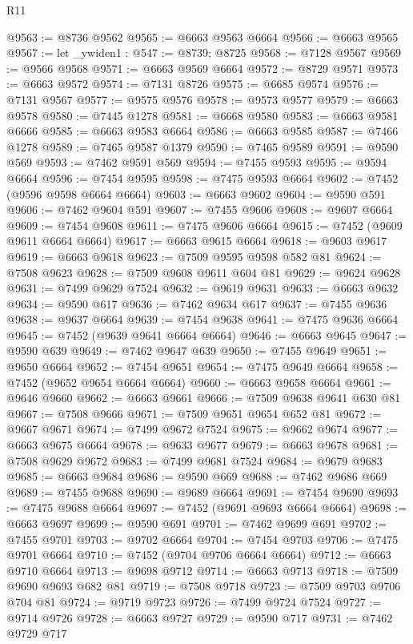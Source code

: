\begin{lexlean}{R11}
\begin{coremodule}
@9563 := @8736 @9562
@9565 := @6663 @9563 @6664
@9566 := @6663 @9565
@9567 := let _ywiden1 : @547 := @8739; @8725
@9568 := @7128 @9567
@9569 := @9566 @9568
@9571 := @6663 @9569 @6664
@9572 := @8729 @9571
@9573 := @6663 @9572
@9574 := @7131 @8726
@9575 := @6685 @9574
@9576 := @7131 @9567
@9577 := @9575 @9576
@9578 := @9573 @9577
@9579 := @6663 @9578
@9580 := @7445 @1278
@9581 := @6668 @9580
@9583 := @6663 @9581 @6666
@9585 := @6663 @9583 @6664
@9586 := @6663 @9585
@9587 := @7466 @1278
@9589 := @7465 @9587 @1379
@9590 := @7465 @9589
@9591 := @9590 @569
@9593 := @7462 @9591 @569
@9594 := @7455 @9593
@9595 := @9594 @6664
@9596 := @7454 @9595
@9598 := @7475 @9593 @6664
@9602 := @7452 (@9596 @9598 @6664 @6664)
@9603 := @6663 @9602
@9604 := @9590 @591
@9606 := @7462 @9604 @591
@9607 := @7455 @9606
@9608 := @9607 @6664
@9609 := @7454 @9608
@9611 := @7475 @9606 @6664
@9615 := @7452 (@9609 @9611 @6664 @6664)
@9617 := @6663 @9615 @6664
@9618 := @9603 @9617
@9619 := @6663 @9618
@9623 := @7509 @9595 @9598 @582 @81
@9624 := @7508 @9623
@9628 := @7509 @9608 @9611 @604 @81
@9629 := @9624 @9628
@9631 := @7499 @9629 @7524
@9632 := @9619 @9631
@9633 := @6663 @9632
@9634 := @9590 @617
@9636 := @7462 @9634 @617
@9637 := @7455 @9636
@9638 := @9637 @6664
@9639 := @7454 @9638
@9641 := @7475 @9636 @6664
@9645 := @7452 (@9639 @9641 @6664 @6664)
@9646 := @6663 @9645
@9647 := @9590 @639
@9649 := @7462 @9647 @639
@9650 := @7455 @9649
@9651 := @9650 @6664
@9652 := @7454 @9651
@9654 := @7475 @9649 @6664
@9658 := @7452 (@9652 @9654 @6664 @6664)
@9660 := @6663 @9658 @6664
@9661 := @9646 @9660
@9662 := @6663 @9661
@9666 := @7509 @9638 @9641 @630 @81
@9667 := @7508 @9666
@9671 := @7509 @9651 @9654 @652 @81
@9672 := @9667 @9671
@9674 := @7499 @9672 @7524
@9675 := @9662 @9674
@9677 := @6663 @9675 @6664
@9678 := @9633 @9677
@9679 := @6663 @9678
@9681 := @7508 @9629 @9672
@9683 := @7499 @9681 @7524
@9684 := @9679 @9683
@9685 := @6663 @9684
@9686 := @9590 @669
@9688 := @7462 @9686 @669
@9689 := @7455 @9688
@9690 := @9689 @6664
@9691 := @7454 @9690
@9693 := @7475 @9688 @6664
@9697 := @7452 (@9691 @9693 @6664 @6664)
@9698 := @6663 @9697
@9699 := @9590 @691
@9701 := @7462 @9699 @691
@9702 := @7455 @9701
@9703 := @9702 @6664
@9704 := @7454 @9703
@9706 := @7475 @9701 @6664
@9710 := @7452 (@9704 @9706 @6664 @6664)
@9712 := @6663 @9710 @6664
@9713 := @9698 @9712
@9714 := @6663 @9713
@9718 := @7509 @9690 @9693 @682 @81
@9719 := @7508 @9718
@9723 := @7509 @9703 @9706 @704 @81
@9724 := @9719 @9723
@9726 := @7499 @9724 @7524
@9727 := @9714 @9726
@9728 := @6663 @9727
@9729 := @9590 @717
@9731 := @7462 @9729 @717

\end{coremodule}
\end{lexlean}
